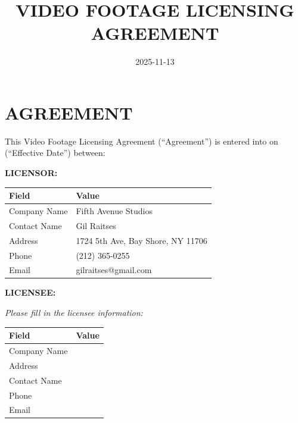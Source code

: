 \documentclass[
  11pt,
]{article}
\title{VIDEO FOOTAGE LICENSING AGREEMENT}
\author{}
\date{2025-11-13}
\begin{document}
\maketitle
\ifdefined\Shaded\renewenvironment{Shaded}{\begin{tcolorbox}[interior hidden, boxrule=0pt, borderline west={3pt}{0pt}{shadecolor}, sharp corners, enhanced, breakable, frame hidden]}{\end{tcolorbox}}\fi

\hypertarget{agreement}{%
\section{AGREEMENT}\label{agreement}}

This Video Footage Licensing Agreement (``Agreement'') is entered into
on \underline{\hspace{3cm}} (``Effective Date'') between:

\textbf{LICENSOR:}

\begin{table}[h]
\centering
\begin{tabular}{L{3.5cm}L{10.5cm}}
\toprule
\textbf{Field} & \textbf{Value} \\
\midrule
Company Name & Fifth Avenue Studios \\
Contact Name & Gil Raitses \\
Address & 1724 5th Ave, Bay Shore, NY 11706 \\
Phone & (212) 365-0255 \\
Email & gilraitses@gmail.com \\
\bottomrule
\end{tabular}
\end{table}

\textbf{LICENSEE:}

\emph{Please fill in the licensee information:}

\begin{table}[h]
\centering
\begin{tabular}{L{3.5cm}L{10.5cm}}
\toprule
\textbf{Field} & \textbf{Value} \\
\midrule
Company Name & \underline{\hspace{8cm}} \\
Address & \underline{\hspace{8cm}} \\
Contact Name & \underline{\hspace{8cm}} \\
Phone & \underline{\hspace{8cm}} \\
Email & \underline{\hspace{8cm}} \\
\bottomrule
\end{tabular}
\end{table}
\end{document}
